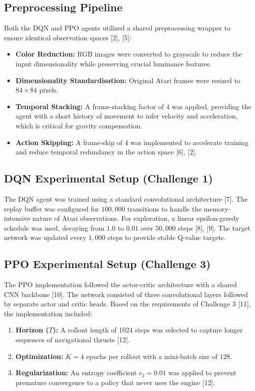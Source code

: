 \documentclass[conference]{IEEEtran}
\begin{document}
\subsection{Preprocessing Pipeline}
Both the DQN and PPO agents utilized a shared preprocessing wrapper to ensure identical observation spaces [2], [5]:
\begin{itemize}
    \item \textbf{Color Reduction:} RGB images were converted to grayscale to reduce the input dimensionality while preserving crucial luminance features.
    \item \textbf{Dimensionality Standardisation:} Original Atari frames were resized to $84 \times 84$ pixels.
    \item \textbf{Temporal Stacking:} A frame-stacking factor of 4 was applied, providing the agent with a short history of movement to infer velocity and acceleration, which is critical for gravity compensation.
    \item \textbf{Action Skipping:} A frame-skip of 4 was implemented to accelerate training and reduce temporal redundancy in the action space [6], [2].
\end{itemize}

\subsection{DQN Experimental Setup (Challenge 1)}
The DQN agent was trained using a standard convolutional architecture [7].
The replay buffer was configured for $100,000$ transitions to handle the memory-intensive nature of Atari observations.
For exploration, a linear epsilon-greedy schedule was used, decaying from $1.0$ to $0.01$ over $50,000$ steps [8], [9].
The target network was updated every $1,000$ steps to provide stable Q-value targets.

\subsection{PPO Experimental Setup (Challenge 3)}
The PPO implementation followed the actor-critic architecture with a shared CNN backbone [10].
The network consisted of three convolutional layers followed by separate actor and critic heads.
Based on the requirements of Challenge 3 [11], the implementation included:
\begin{enumerate}
    \item \textbf{Horizon ($T$):} A rollout length of 1024 steps was selected to capture longer sequences of navigational thrusts [12].
    \item \textbf{Optimization:} $K = 4$ epochs per rollout with a mini-batch size of $128$.
    \item \textbf{Regularization:} An entropy coefficient $c_2 = 0.01$ was applied to prevent premature convergence to a policy that never uses the engine [12].
\end{enumerate}
\end{document}
